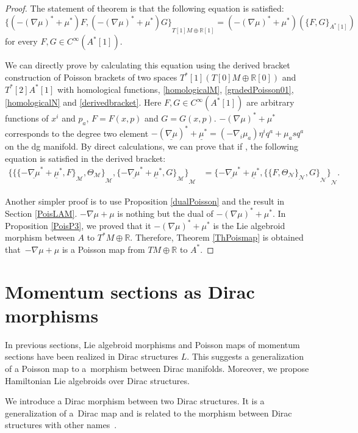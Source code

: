 \documentclass[10pt,a4paper]{amsart}
\numberwithin{equation}{section}
\def\bR{{\mathbb{R}}}
\newcommand{\calM}{{\mathcal M}}
\newcommand{\calN}{{\mathcal N}}
\newcommand{\sbv}[2]{{\{{{#1},{#2}}\}}}
\newcommand{\bracket}[2]{\langle #1,\,#2\rangle}
\newcommand{\Thetam}{{\Theta_{\calM}}}
\newcommand{\Thetan}{{\Theta_{\calN}}}
\newcommand{\umu}{\underline{\mu}}
\newcommand{\unablamu}{\underline{\nabla \mu}}
\newcommand{\baS}{{{}^A S}}
\begin{document}
\begin{proof}
The statement of theorem is that the following equation is satisfied:
\[
\sbv{(-(\nabla \mu)^* + \mu^*) F}{(-(\nabla \mu)^* + \mu^*)G}_{T[1]M \oplus \bR[1]} = (-(\nabla \mu)^* + \mu^*)(\sbv{F}{G}_{A^*[1]})
\]
for every $F, G \in C^{\infty}(A^*[1])$.


We can directly prove by calculating this equation
using the derived bracket construction of
Poisson brackets of two spaces $T^*[1](T[0]M \oplus \bR[0])$ and $T^*[2]A^*[1]$
with homological functions, \eqref{homologicalM}, \eqref{gradedPoisson01}, \eqref{homologicalN} and \eqref{derivedbracket}.
Here $F, G \in C^{\infty}(A^*[1])$ are arbitrary functions of $x^i$ and $p_a$,
$F= F(x, p)$ and $G= G(x, p)$.
$-(\nabla \mu)^* + \mu^*$ corresponds to the degree two element $-(\unablamu)^* + \umu^* =
(-\nabla_i \mu_a) \eta^i q^a + \mu_a s q^a$ on the dg manifold.
By direct calculations,
we can prove that if \smash{$\bracket{\baS}{\mu} =0$},
the following equation is satisfied
in the derived bracket:
\begin{align*}
\sbv{\sbv{\sbv{-\unablamu^* + \umu^*}{F}_{\calM}}{\Thetam}_{\calM}}
{\sbv{-\unablamu^* + \umu^*}{G}_{\calM}}_{\calM} &=
\sbv{-\unablamu^* + \umu^*}{\sbv{\sbv{F}{\Thetan}_{\calN}}{G}_{\calN}}_{\calN}.
\end{align*}

Another simpler proof is to use Proposition \ref{dualPoisson}
and the result in Section \ref{PoisLAM}.
$-\nabla \mu + \mu$ is nothing but the dual of
$-(\nabla \mu)^* + \mu^*$.
In Proposition \ref{PoisP3}, we proved that it
$-(\nabla \mu)^* + \mu^*$ is the Lie algebroid morphism
between $A$ to $T^*M \oplus \bR$.
Therefore, Theorem \ref{ThPoismap} is obtained that~${-\nabla \mu + \mu}$ is a Poisson map from
$TM \oplus \bR$ to $A^*$.
\end{proof}


\section{Momentum sections as Dirac morphisms}\label{sec:Dirac}
In previous sections, Lie algebroid morphisms and Poisson maps
of momentum sections have been realized in Dirac structures $L$.
This suggests a generalization of a Poisson map to a~morphism between
Dirac manifolds.
Moreover, we propose Hamiltonian Lie algebroids over Dirac structures.


We introduce a Dirac morphism \cite{AlekseevBursztynMeinrenken} between two Dirac structures. It is a generalization of a~Dirac map \cite{BursztynCrainic1, BursztynCrainic2} and is related to the morphism between Dirac structures with other names~\cite{BursztynIglesiasPonteSevera}.
\end{document}
